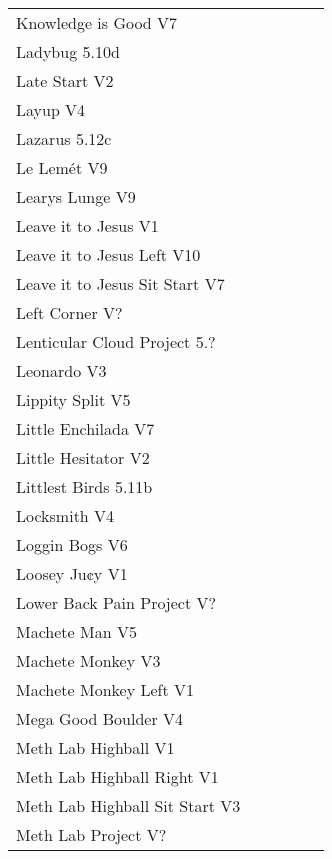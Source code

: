 \begin{flushleft}
\begin{center}
\begin{supertabular}{p{0.76\linewidth}p{0.08\linewidth}}
Knowledge is Good V7 & \pageref{vr:Knowledge is Good} \\
Ladybug 5.10d & \pageref{rt:Ladybug} \\
Late Start V2 & \pageref{vr:Late Start} \\
Layup V4 & \pageref{vr:Layup} \\
Lazarus 5.12c & \pageref{vr:Lazarus} \\
Le Lemét V9 & \pageref{rt:Le Lemét} \\
Learys Lunge V9 & \pageref{vr:Learys Lunge} \\
Leave it to Jesus V1 & \pageref{rt:Leave it to Jesus} \\
Leave it to Jesus Left V10 & \pageref{vr:Leave it to Jesus Left} \\
Leave it to Jesus Sit Start V7 & \pageref{vr:Leave it to Jesus Sit Start} \\
Left Corner V? & \pageref{rt:Left Corner} \\
Lenticular Cloud Project 5.? & \pageref{rt:Lenticular Cloud Project} \\
Leonardo V3 & \pageref{rt:Leonardo} \\
Lippity Split V5 & \pageref{rt:Lippity Split} \\
Little Enchilada V7 & \pageref{rt:Little Enchilada} \\
Little Hesitator V2 & \pageref{rt:June 1} \\
Littlest Birds 5.11b & \pageref{rt:Littlest Birds} \\
Locksmith V4 & \pageref{rt:Locksmith} \\
Loggin Bogs V6 & \pageref{rt:Loggin Bogs} \\
Loosey Ju¢y V1 & \pageref{rt:Loosey Ju¢y} \\
Lower Back Pain Project V? & \pageref{vr:Lower Back Pain Project} \\
Machete Man V5 & \pageref{vr:Machete Man} \\
Machete Monkey V3 & \pageref{rt:Machete Monkey} \\
Machete Monkey Left V1 & \pageref{vr:Machete Monkey Left} \\
Mega Good Boulder V4 & \pageref{rt:MGB} \\
Meth Lab Highball V1 & \pageref{rt:Meth Lab Highball} \\
Meth Lab Highball Right V1 & \pageref{rt:Meth Lab Highball Right} \\
Meth Lab Highball Sit Start V3 & \pageref{vr:Meth Lab Highball Sit Start} \\
Meth Lab Project V? & \pageref{rt:Meth Lab Project} \\

\end{supertabular}
\end{center}
\end{flushleft}

